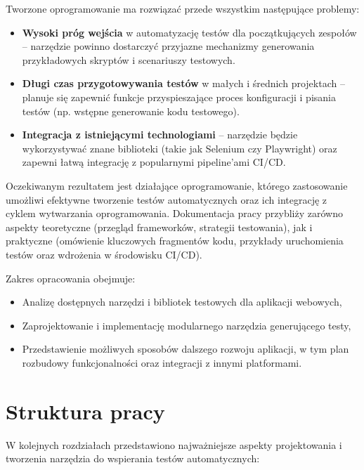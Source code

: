 \documentclass[12pt]{report}
\begin{document}
Tworzone oprogramowanie ma rozwiązać przede wszystkim następujące problemy:
\begin{itemize}
    \item \textbf{Wysoki próg wejścia} w automatyzację testów dla początkujących zespołów -- narzędzie powinno dostarczyć przyjazne mechanizmy generowania przykładowych skryptów i scenariuszy testowych.
    \item \textbf{Długi czas przygotowywania testów} w małych i średnich projektach -- planuje się zapewnić funkcje przyspieszające proces konfiguracji i pisania testów (np. wstępne generowanie kodu testowego).
    \item \textbf{Integracja z istniejącymi technologiami} -- narzędzie będzie wykorzystywać znane biblioteki (takie jak Selenium czy Playwright) oraz zapewni łatwą integrację z popularnymi pipeline’ami CI/CD.
\end{itemize}

Oczekiwanym rezultatem jest działające oprogramowanie, którego zastosowanie umożliwi efektywne tworzenie testów automatycznych oraz ich integrację z cyklem wytwarzania oprogramowania. Dokumentacja pracy przybliży zarówno aspekty teoretyczne (przegląd frameworków, strategii testowania), jak i praktyczne (omówienie kluczowych fragmentów kodu, przykłady uruchomienia testów oraz wdrożenia w środowisku CI/CD).

Zakres opracowania obejmuje:
\begin{itemize}
    \item Analizę dostępnych narzędzi i bibliotek testowych dla aplikacji webowych,
    \item Zaprojektowanie i implementację modularnego narzędzia generującego testy,
    \item Przedstawienie możliwych sposobów dalszego rozwoju aplikacji, w tym plan rozbudowy funkcjonalności oraz integracji z innymi platformami.
\end{itemize}

\section{Struktura pracy}
W kolejnych rozdziałach przedstawiono najważniejsze aspekty projektowania i tworzenia narzędzia do wspierania testów automatycznych:
\end{document}
